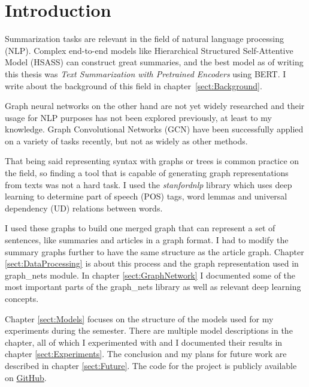 \chapter*{Introduction}\label{sect:Introduction}

Summarization tasks are relevant in the field of natural language processing (NLP). Complex end-to-end models like Hierarchical Structured Self-Attentive Model (HSASS) \cite{HSSAS} can construct great summaries, and the best model as of writing this thesis was \textit{Text Summarization with Pretrained Encoders}\cite{BERTsum} using BERT. I write about the background of this field in chapter~\ref{sect:Background}.

Graph neural networks on the other hand are not yet widely researched and their usage for NLP purposes has not been explored previously, at least to my knowledge. Graph Convolutional Networks (GCN) have been successfully applied on a variety of tasks recently, but not as widely as other methods.

That being said representing syntax with graphs or trees is common practice on the field, so finding a tool that is capable of generating graph representations from texts was not a hard task. I used the \textit{stanfordnlp} library which uses deep learning to determine part of speech (POS) tags, word lemmas and universal dependency (UD) relations between words.

I used these graphs to build one merged graph that can represent a set of sentences, like summaries and articles in a graph format. I had to modify the summary graphs further to have the same structure as the article graph. Chapter \ref{sect:DataProcessing} is about this process and the graph representation used in graph\_nets module. In chapter \ref{sect:GraphNetwork} I documented some of the most important parts of the graph\_nets library as well as relevant deep learning concepts.

Chapter \ref{sect:Models} focuses on the structure of the models used for my experiments during the semester. There are multiple model descriptions in the chapter, all of which I experimented with and I documented their results in chapter \ref{sect:Experiments}. The conclusion and my plans for future work are described in chapter \ref{sect:Future}. The code for the project is publicly available on \href{https://github.com/GKingA/graph\_transformations}{GitHub}.